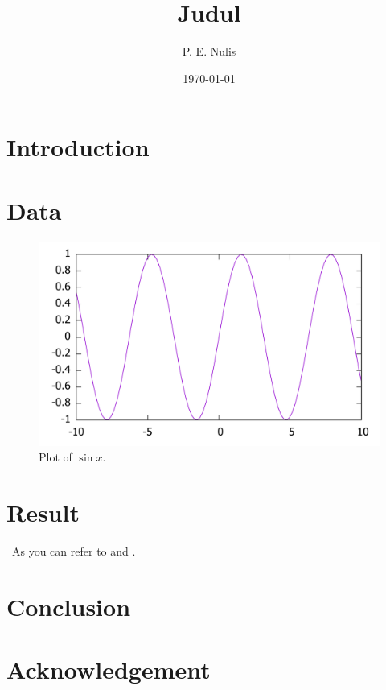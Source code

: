 \documentclass[11pt,a4paper]{article}
\title{Judul}
\author{P. E. Nulis}
\date{\today}
\begin{document}
\maketitle

\begin{abstract}
\lipsum[1]
\end{abstract}

\begin{multicols}{2}

\section{Introduction}
\lipsum

\section{Data}
\lipsum

\end{multicols}

\begin{figure}
    \includegraphics[width=\linewidth]{plot}
    \caption[Plot of $\sin x$.]{Plot of $\sin x$.}
    \label{fig:plot}
\end{figure}

\begin{multicols}{2}

\section{Result}
\lipsum\ As you can refer to \cite{siess2000} and \cite{stepien2002}.

\section{Conclusion}
\lipsum

\section*{Acknowledgement}
\lipsum[4]




\end{multicols}
\end{document}
